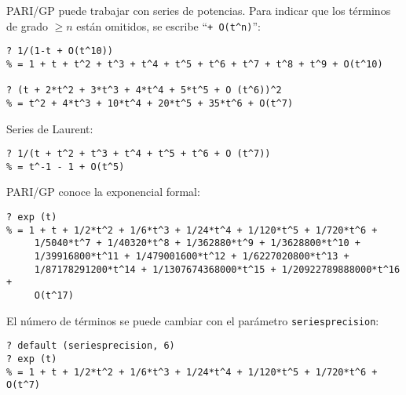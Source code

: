 \documentclass{article}
\begin{document}
\begin{shaded}
\small\noindent PARI/GP puede trabajar con series de potencias. Para indicar que los términos de grado $\ge n$ están omitidos, se escribe ``\verb|+ O(t^n)|'':

\begin{verbatim}
? 1/(1-t + O(t^10))
% = 1 + t + t^2 + t^3 + t^4 + t^5 + t^6 + t^7 + t^8 + t^9 + O(t^10)

? (t + 2*t^2 + 3*t^3 + 4*t^4 + 5*t^5 + O (t^6))^2
% = t^2 + 4*t^3 + 10*t^4 + 20*t^5 + 35*t^6 + O(t^7)
\end{verbatim}

\noindent Series de Laurent:

\begin{verbatim}
? 1/(t + t^2 + t^3 + t^4 + t^5 + t^6 + O (t^7))
% = t^-1 - 1 + O(t^5)
\end{verbatim}

\noindent PARI/GP conoce la exponencial formal:

\begin{verbatim}
? exp (t)
% = 1 + t + 1/2*t^2 + 1/6*t^3 + 1/24*t^4 + 1/120*t^5 + 1/720*t^6 +
     1/5040*t^7 + 1/40320*t^8 + 1/362880*t^9 + 1/3628800*t^10 +
     1/39916800*t^11 + 1/479001600*t^12 + 1/6227020800*t^13 +
     1/87178291200*t^14 + 1/1307674368000*t^15 + 1/20922789888000*t^16 +
     O(t^17)
\end{verbatim}

\noindent El número de términos se puede cambiar con el parámetro \verb|seriesprecision|:

\begin{verbatim}
? default (seriesprecision, 6)
? exp (t)
% = 1 + t + 1/2*t^2 + 1/6*t^3 + 1/24*t^4 + 1/120*t^5 + 1/720*t^6 + O(t^7)
\end{verbatim}

%
%
%
%
\end{shaded}
\end{document}
